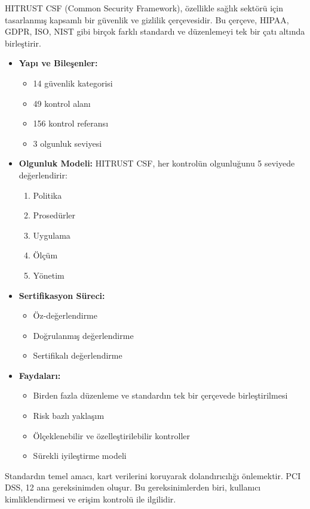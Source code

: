 HITRUST CSF (Common Security Framework), özellikle sağlık sektörü için tasarlanmış kapsamlı bir güvenlik ve gizlilik çerçevesidir. Bu çerçeve, HIPAA, GDPR, ISO, NIST gibi birçok farklı standardı ve düzenlemeyi tek bir çatı altında birleştirir.

\begin{itemize}
\item \textbf{Yapı ve Bileşenler:}
\begin{itemize}
    \item 14 güvenlik kategorisi
    \item 49 kontrol alanı
    \item 156 kontrol referansı
    \item 3 olgunluk seviyesi
\end{itemize}

\item \textbf{Olgunluk Modeli:} HITRUST CSF, her kontrolün olgunluğunu 5 seviyede değerlendirir:
\begin{enumerate}
    \item Politika
    \item Prosedürler
    \item Uygulama
    \item Ölçüm
    \item Yönetim
\end{enumerate}

\item \textbf{Sertifikasyon Süreci:}
\begin{itemize}
    \item Öz-değerlendirme
    \item Doğrulanmış değerlendirme
    \item Sertifikalı değerlendirme
\end{itemize}

\item \textbf{Faydaları:}
\begin{itemize}
    \item Birden fazla düzenleme ve standardın tek bir çerçevede birleştirilmesi
    \item Risk bazlı yaklaşım
    \item Ölçeklenebilir ve özelleştirilebilir kontroller
    \item Sürekli iyileştirme modeli
\end{itemize}
\end{itemize} Standardın temel amacı, kart verilerini koruyarak dolandırıcılığı önlemektir. PCI DSS, 12 ana gereksinimden oluşur. Bu gereksinimlerden biri, kullanıcı kimliklendirmesi ve erişim kontrolü ile ilgilidir.

